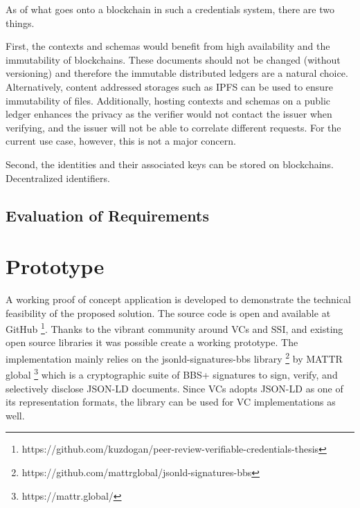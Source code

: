 As of what goes onto a blockchain in such a credentials system, there are two things. 

First, the contexts and schemas would benefit from high availability and the immutability of blockchains. These documents should not be changed (without versioning) and therefore the immutable distributed ledgers are a natural choice. Alternatively, content addressed storages such as \acrshort{IPFS} can be used to ensure immutability of files. Additionally, hosting contexts and schemas on a public ledger enhances the privacy as the verifier would not contact the issuer when verifying, and the issuer will not be able to correlate different requests. For the current use case, however, this is not a major concern. 

Second, the identities and their associated keys can be stored on blockchains.
Decentralized identifiers. 

\subsection{Evaluation of Requirements}















\section{Prototype}


A working proof of concept application is developed to demonstrate the technical feasibility of the proposed solution. The source code is open and available at GitHub \footnote{https://github.com/kuzdogan/peer-review-verifiable-credentials-thesis}. Thanks to the vibrant community around VCs and SSI, and existing open source libraries it was possible create a working prototype. The implementation mainly relies on the jsonld-signatures-bbs library \footnote{https://github.com/mattrglobal/jsonld-signatures-bbs} by MATTR global \footnote{https://mattr.global/} which is a cryptographic suite of BBS+ signatures to sign, verify, and selectively disclose JSON-LD documents. Since VCs adopts JSON-LD as one of its representation formats, the library can be used for VC implementations as well.

